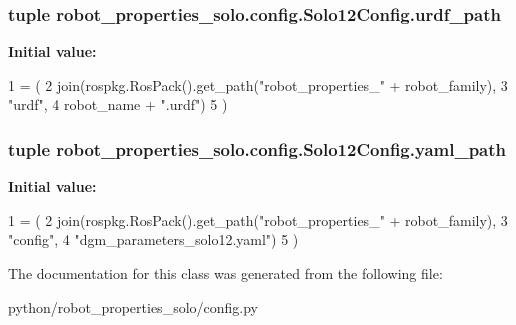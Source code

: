 \subsubsection[{\texorpdfstring{urdf\+\_\+path}{urdf_path}}]{\setlength{\rightskip}{0pt plus 5cm}tuple robot\+\_\+properties\+\_\+solo.\+config.\+Solo12\+Config.\+urdf\+\_\+path\hspace{0.3cm}{\ttfamily [static]}}\hypertarget{classrobot__properties__solo_1_1config_1_1Solo12Config_a989fedb02f6a9dd4136f034ed9482489}{}\label{classrobot__properties__solo_1_1config_1_1Solo12Config_a989fedb02f6a9dd4136f034ed9482489}
{\bfseries Initial value\+:}
\begin{DoxyCode}
1 = (
2         join(rospkg.RosPack().get\_path(\textcolor{stringliteral}{"robot\_properties\_"} + robot\_family),
3              \textcolor{stringliteral}{"urdf"},
4              robot\_name + \textcolor{stringliteral}{".urdf"})
5     )
\end{DoxyCode}
\subsubsection[{\texorpdfstring{yaml\+\_\+path}{yaml_path}}]{\setlength{\rightskip}{0pt plus 5cm}tuple robot\+\_\+properties\+\_\+solo.\+config.\+Solo12\+Config.\+yaml\+\_\+path\hspace{0.3cm}{\ttfamily [static]}}\hypertarget{classrobot__properties__solo_1_1config_1_1Solo12Config_a484dfe0fb7409d9848a6143f7e64955b}{}\label{classrobot__properties__solo_1_1config_1_1Solo12Config_a484dfe0fb7409d9848a6143f7e64955b}
{\bfseries Initial value\+:}
\begin{DoxyCode}
1 = (
2         join(rospkg.RosPack().get\_path(\textcolor{stringliteral}{"robot\_properties\_"} + robot\_family),
3              \textcolor{stringliteral}{"config"},
4              \textcolor{stringliteral}{"dgm\_parameters\_solo12.yaml"})
5     )
\end{DoxyCode}


The documentation for this class was generated from the following file\+:\begin{DoxyCompactItemize}
\item 
python/robot\+\_\+properties\+\_\+solo/config.\+py\end{DoxyCompactItemize}
